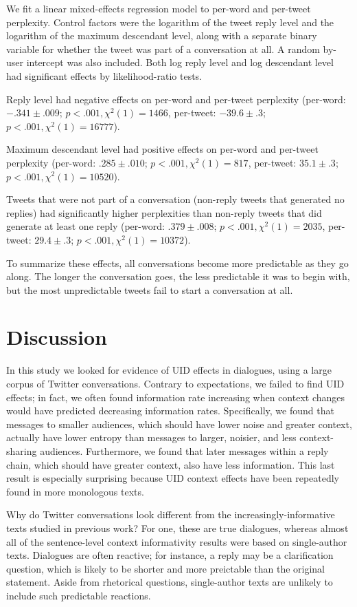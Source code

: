 \documentclass[11pt,letterpaper]{article}
\begin{document}
We fit a linear mixed-effects regression model to per-word and per-tweet perplexity.  Control factors were the logarithm of the tweet reply level and the logarithm of the maximum descendant level, along with a separate binary variable for whether the tweet was part of a conversation at all. A random by-user intercept was also included.  Both log reply level and log descendant level had significant effects by likelihood-ratio tests.

Reply level had negative effects on per-word and per-tweet perplexity (per-word: $-.341 \pm .009$; $p < .001, \chi^2(1) = 1466$, per-tweet: $-39.6 \pm .3$; $p < .001, \chi^2(1) =  16777$).

Maximum descendant level had positive effects on per-word and per-tweet perplexity (per-word: $.285 \pm .010$; $p < .001, \chi^2(1) = 817$, per-tweet: $35.1 \pm .3$; $p < .001, \chi^2(1) = 10520$).

Tweets that were not part of a conversation (non-reply tweets that generated no replies) had significantly higher perplexities than non-reply tweets that did generate at least one reply (per-word: $.379 \pm .008$; $p < .001, \chi^2(1) = 2035$, per-tweet: $29.4 \pm .3$; $p < .001, \chi^2(1) = 10372$).  

To summarize these effects, all conversations become more predictable as they go along. The longer the conversation goes, the less predictable it was to begin with, but the most unpredictable tweets fail to start a conversation at all.

\section{Discussion}

In this study we looked for evidence of UID effects in dialogues, using a large corpus of Twitter conversations.  Contrary to expectations, we failed to find UID effects; in fact, we often found information rate increasing when context changes would have predicted decreasing information rates.  Specifically, we found that messages to smaller audiences, which should have lower noise and greater context, actually have lower entropy than messages to larger, noisier, and less context-sharing audiences. Furthermore, we found that later messages within a reply chain, which should have greater context, also have less information.  This last result is especially surprising because UID context effects have been repeatedly found in more monologous texts.

Why do Twitter conversations look different from the increasingly-informative texts studied in previous work? For one, these are true dialogues, whereas almost all of the sentence-level context informativity results were based on single-author texts.  Dialogues are often reactive; for instance, a reply may be a clarification question, which is likely to be shorter and more preictable than the original statement. Aside from rhetorical questions, single-author texts are unlikely to include such predictable reactions.
\end{document}
